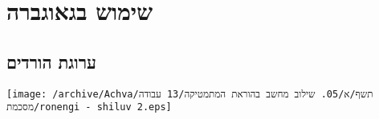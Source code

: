 
\section{שימוש  בגאוגברה}

\subsection*{ערוגת הורדים}



\texttt{[image: /archive/Achva/תשף/א/05. שילוב מחשב בהוראת המתמטיקה/13 עבודה מסכמת/ronengi - shiluv 2.eps]}